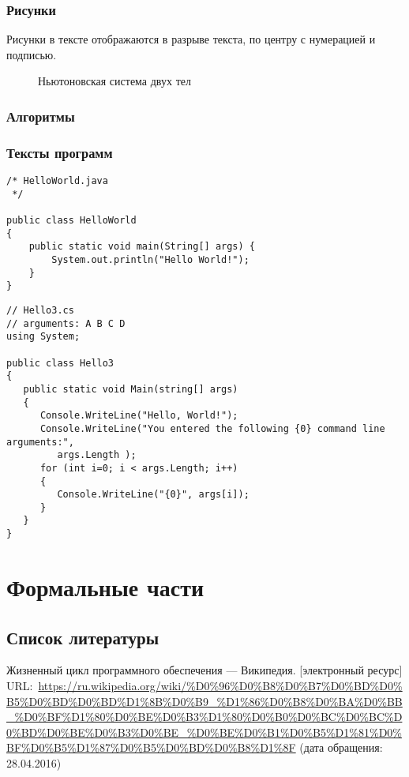 \documentclass[a4paper,14pt,final]{extreport}
\begin{document}
\subsection{Рисунки}
\label{sec:figures}

Рисунки в тексте отображаются в разрыве текста, по центру с нумерацией и подписью.
\begin{figure}[bh]
  \centering
  \def\svgwidth{0.8\linewidth}
  


  \caption{Ньютоновская система двух тел}
  \label{fig:bodies}
\end{figure}


\subsection{Алгоритмы}
\label{sec:algs}

\subsection{Тексты программ}
\label{sec:sources}

\begin{verbatim}
/* HelloWorld.java
 */

public class HelloWorld
{
	public static void main(String[] args) {
		System.out.println("Hello World!");
	}
}
\end{verbatim}

\begin{verbatim}
// Hello3.cs
// arguments: A B C D
using System;

public class Hello3
{
   public static void Main(string[] args)
   {
      Console.WriteLine("Hello, World!");
      Console.WriteLine("You entered the following {0} command line arguments:",
         args.Length );
      for (int i=0; i < args.Length; i++)
      {
         Console.WriteLine("{0}", args[i]);
      }
   }
}
\end{verbatim}

\chapter{Формальные части}
\label{cha:formal}

\section{Список литературы}
\label{sec:refs}

\begin{thebibliography}{99}
 Жизненный цикл программного обеспечения --- Википедия. [электронный ресурс] URL:~\url{https://ru.wikipedia.org/wiki/%D0%96%D0%B8%D0%B7%D0%BD%D0%B5%D0%BD%D0%BD%D1%8B%D0%B9_%D1%86%D0%B8%D0%BA%D0%BB_%D0%BF%D1%80%D0%BE%D0%B3%D1%80%D0%B0%D0%BC%D0%BC%D0%BD%D0%BE%D0%B3%D0%BE_%D0%BE%D0%B1%D0%B5%D1%81%D0%BF%D0%B5%D1%87%D0%B5%D0%BD%D0%B8%D1%8F} (дата обращения: 28.04.2016)
\end{thebibliography}
\end{document}
